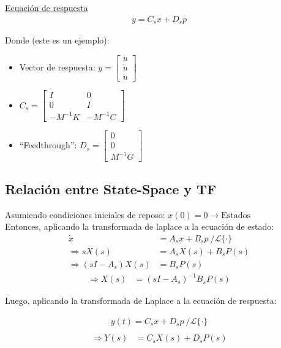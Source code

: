 \underline{Ecuación de respuesta} \\

\begin{align*}
    {y}={C_s}{x}+{D_s}{p}
\end{align*}

Donde (este es un ejemplo):
\begin{itemize}
    \item Vector de respuesta: ${y}=\begin{bmatrix}{u} \\ {\dot{u}}\\ {\ddot{u}}\end{bmatrix}$

    \item ${C_s}=\begin{bmatrix}{I} & {0}\\
    {0} & {I}\\ 
    -{M}^{-1}{K} & -{M}^{-1}{C}\end{bmatrix}$
    \item ``Feedthrough'': ${D_s}=\begin{bmatrix}{0}\\
    {0}\\ {M}^{-1}{G}\end{bmatrix}$
\end{itemize}


\subsection{Relación entre State-Space y TF}

Asumiendo condiciones iniciales de reposo: ${x}(0) = {0} \longrightarrow \text{Estados}$\\

Entonces, aplicando la transformada de laplace a la ecuación de estado:
\begin{align*} \label{eq:ss2tf_1}
    {\dot{x}}&={A_s}{x}+{B_s}{p} ~/\mathcal{L}\{\cdot\}\\
    \Longrightarrow s{X}(s)&= {A_s}{X}(s)+{B_s}{P}(s)\\
    \Longrightarrow (s{I}-{A_s}){X}(s)&={B_s}{P}(s)
\end{align*}
\begin{align}
    \Longrightarrow {X}(s)&=(s{I}-{A_s})^{-1}{B_s}{P}(s)
\end{align}

Luego, aplicando la transformada de Laplace a la ecuación de respuesta:

\begin{align*}
    {y}(t)={C_s}{x}+{D_s}{p} ~/\mathcal{L}\{\cdot\}\\
\end{align*}
\begin{align}\label{eq:ss2tf_2}
    \Longrightarrow {Y}(s)&={C_s}{X}(s)+{D_s}{P}(s)
\end{align} 


